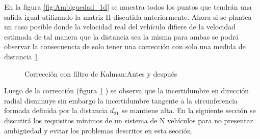 En la figura \ref{fig:Ambiguedad_1d} se muestra todos los puntos que tendrán una salida igual utilizando la matriz H discutida anteriormente. Ahora si se plantea un caso posible donde la velocidad real del vehículo difiere de la velocidad estimada de tal manera que la distancia sea la misma para ambas se podrá observar la consecuencia de solo tener una corrección con solo una medida de distancia \ref{fig:Correción2car}. 

\begin{figure}[!htb]
  \begin{center}
    \caption{Corrección con filtro de Kalman:Antes y después}
    \label{fig:Correción2car}
  \end{center}
\end{figure}
Luego de la corrección (figura \ref{fig:Correción2car} ) se observa que la incertidumbre en dirección radial disminuye sin embargo la incertidumbre tangente a la circunferencia formada definida por la distancia $d_{21}$ se mantiene alta. En la siguiente sección se discutirá los requisitos mínimos de un sistema de N vehículos para no presentar ambigüedad y evitar los problemas descritos en esta sección. 

